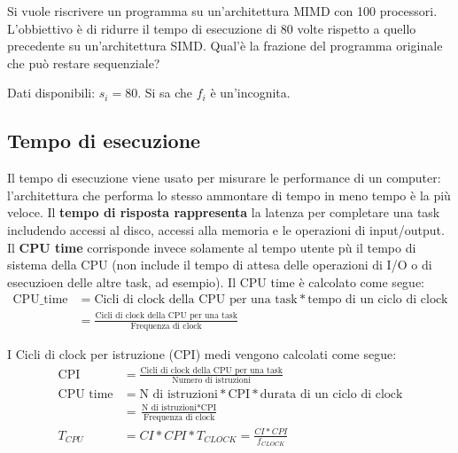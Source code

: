 \begin{exercise}
	Si vuole riscrivere un programma su un'architettura MIMD con 100 processori. L'obbiettivo è di ridurre il tempo di esecuzione di 80 volte rispetto a quello precedente su un'architettura SIMD. Qual'è la frazione del programma originale che può restare sequenziale?
\end{exercise}
\begin{solution}
	Dati disponibili: $s_i = 80$. Si sa che $f_i$ è un'incognita.
\end{solution}













\subsection{Tempo di esecuzione} Il tempo di esecuzione viene usato per misurare le performance di un computer: l'architettura che performa lo stesso ammontare di tempo in meno tempo è la più veloce. Il \textbf{tempo di risposta rappresenta} la latenza per completare una task includendo accessi al disco, accessi alla memoria e le operazioni di input/output. Il \textbf{CPU time} corrisponde invece solamente al tempo utente pù il tempo di sistema della CPU (non include il tempo di attesa delle operazioni di I/O o di esecuzioen delle altre task, ad esempio).
Il CPU time è calcolato come segue:
\begin{align*}
\text{CPU\_time} &= \text{Cicli di clock della CPU per una task} * \text{tempo di un ciclo di clock}\\
&= \frac{\text{Cicli di clock della CPU per una task}}{\text{Frequenza di clock}}
\end{align*}

I Cicli di clock per istruzione (CPI) medi vengono calcolati come segue:
\begin{align*}
\text{CPI} &= \frac{\text{Cicli di clock della CPU per una task}}{\text{Numero di istruzioni}}\\
\text{CPU time} &= \text{N di istruzioni} * \text{CPI} * \text{durata di un ciclo di clock}\\
&= \frac{\text{N di istruzioni} * \text{CPI}}{\text{Frequenza di clock}}\\
T_{CPU} &= CI * CPI * T_{CLOCK} = \frac{CI * CPI}{f_{CLOCK}}
\end{align*}

